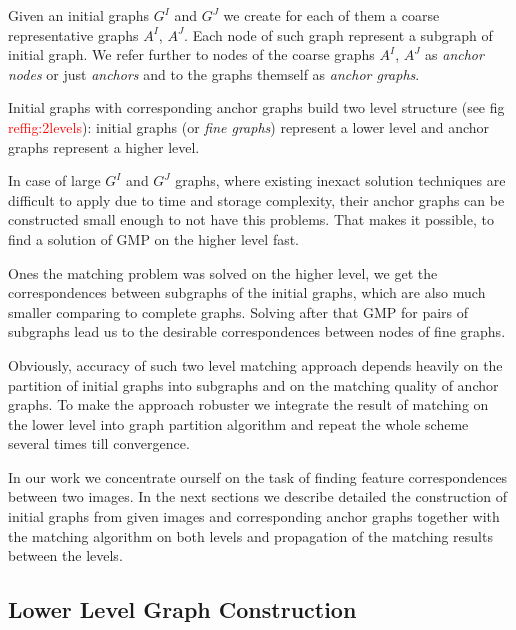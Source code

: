 \documentclass[
	fontsize=12pt,
	paper=a4,
	twoside=false,
	numbers=noenddot,
	plainheadsepline,
	toc=listof,
	toc=bibliography
]{scrartcl}
\newcommand\ToDo[1]{\textcolor{red}{#1}}
\begin{document}
Given an initial graphs $G^I$ and $G^J$ we create for each of them a coarse representative graphs $A^I$, $A^J$. Each node of such graph represent a subgraph of initial graph. We refer further to nodes of the coarse graphs $A^I$, $A^J$ as \emph{anchor nodes} or just \emph{anchors} and to the graphs themself as \emph{anchor graphs}.

Initial graphs with corresponding anchor graphs build two level structure (see fig \ToDo{ref{fig:2levels}}): initial graphs (or \emph{fine graphs}) represent a lower level and anchor graphs represent a higher level.  

In case of large $G^I$ and $G^J$ graphs, where existing inexact solution techniques are difficult to apply due to time and storage complexity, their anchor graphs can be constructed small enough to not have this problems. That makes it possible, to find a solution of GMP on the higher level fast. 

Ones the matching problem was solved on the higher level, we get the correspondences between subgraphs of the initial graphs, which are also much smaller comparing to complete graphs. Solving after that GMP for pairs of subgraphs lead us to the desirable correspondences between nodes of fine graphs.

Obviously, accuracy of such two level matching approach depends heavily on the partition of initial graphs into subgraphs and on the matching quality of anchor graphs. To make the approach robuster we integrate the result of matching on the lower level into graph partition algorithm and repeat the whole scheme several times till convergence.

In our work we concentrate ourself on the task of finding feature correspondences between two images. In the next sections we describe detailed the construction of initial graphs from given images and corresponding anchor graphs together with the matching algorithm on both levels and propagation of the matching results between the levels.

\begin{figure}
	\centering
	\label{fig:2levels}
%	
\end{figure}

\FloatBarrier

\subsection{Lower Level Graph Construction}
\end{document}
